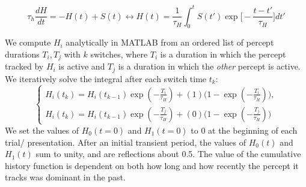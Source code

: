 \begin{equation}
\tau_h \frac{dH}{dt} = -H(t) + S(t) \leftrightarrow H(t) = \frac{1}{\tau_H}  \int_0^t S(t') \exp \bigg[- \frac{t-t'}{\tau_H} \bigg] dt'
\end{equation}

We compute $H_i$ analytically in MATLAB from an ordered list of percept durations $T_i, T_j$ with $k$ switches, where $T_i$ is a duration in which the percept tracked by $H_i$ is active and $T_j$ is a duration in which the \textit{other} percept is active. We iteratively solve the integral after each switch time $t_k$: 
\begin{equation*}
\begin{cases}

H_i(t_k) = H_i(t_{k-1}) \exp(- \frac{T_i}{\tau_H}) + (1)  \big(1-\exp(-\frac{T_i}{\tau_H})\big), \\
H_i(t_k) = H_i(t_{k-1}) \exp(- \frac{T_j}{\tau_H}) + (0)  \big(1-\exp(-\frac{T_j}{\tau_H})\big)

\end{cases}
\end{equation*}
We set the values of $H_0(t=0)$ and $H_1(t=0)$ to 0 at the beginning of each trial/ presentation. After an initial transient period, the values of $H_0(t)$ and $H_1(t)$ sum to unity, and are reflections about 0.5. The value of the cumulative history function is dependent on both how long and how recently the percept it tracks was dominant in the past.

